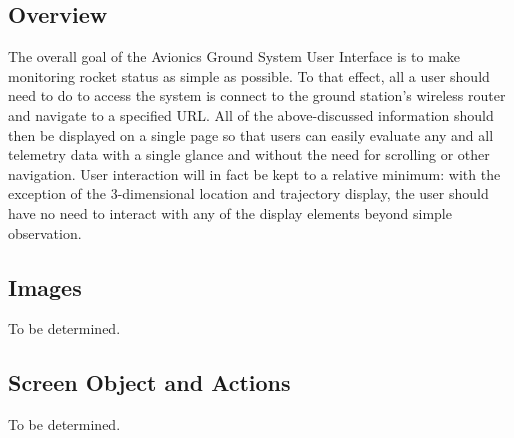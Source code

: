 \documentclass[journal,10pt,onecolumn,compsoc]{IEEEtran}
\begin{document}
	\subsection{Overview}
		The overall goal of the Avionics Ground System User Interface is to make monitoring rocket status as simple as possible.
		To that effect, all a user should need to do to access the system is connect to the ground station's wireless router and navigate to a specified URL.
		All of the above-discussed information should then be displayed on a single page so that users can easily evaluate any and all telemetry data with a single glance and without the need for scrolling or other navigation.
		User interaction will in fact be kept to a relative minimum: with the exception of the 3-dimensional location and trajectory display, the user should have no need to interact with any of the display elements beyond simple observation.
	
	\subsection{Images}
		To be determined.
		
	\subsection{Screen Object and Actions}
		To be determined.
		
\end{document}
